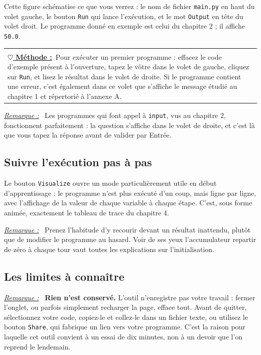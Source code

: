 \documentclass[a4paper,11pt,openany]{book}
\makeatletter
\newcommand{\code}[1]{\texttt{\textcolor{codebleu}{#1}}}
\newenvironment{cadre}%
 {\par\vspace{2mm}\noindent\begin{tabular}{|@{\hspace{4mm}}p{0.93\textwidth}@{\hspace{4mm}}|}
  \hline \\[-2mm]}%
 {\\[2mm] \hline \end{tabular}\par\vspace{3mm}}
\newcommand{\methode}{\textbf{\underline{$\heartsuit$ Méthode :}}~}
\newenvironment{remarque}%
 {\par\vspace{1mm}\begin{list}{}{\leftmargin=1cm \rightmargin=0.5cm}\item[]%
  \textit{\underline{Remarque :}}~}%
 {\end{list}\vspace{1mm}}
\makeatother
\begin{document}
Cette figure schématise ce que vous verrez : le nom de fichier \code{main.py} en haut du volet gauche, le bouton \code{Run} qui lance l'exécution, et le mot \code{Output} en tête du volet droit. Le programme donné en exemple est celui du chapitre 2 ; il affiche \code{50.0}.

\begin{cadre}
\methode Pour exécuter un premier programme : effacez le code d'exemple présent à l'ouverture, tapez le vôtre dans le volet de gauche, cliquez sur \code{Run}, et lisez le résultat dans le volet de droite. Si le programme contient une erreur, c'est également dans ce volet que s'affiche le message étudié au chapitre 1 et répertorié à l'annexe A.
\end{cadre}

\begin{remarque}
Les programmes qui font appel à \code{input}, vus au chapitre 2, fonctionnent parfaitement : la question s'affiche dans le volet de droite, et c'est là que vous tapez la réponse avant de valider par Entrée.
\end{remarque}

\subsection{Suivre l'exécution pas à pas}

Le bouton \code{Visualize} ouvre un mode particulièrement utile en début d'apprentissage : le programme n'est plus exécuté d'un coup, mais ligne par ligne, avec l'affichage de la valeur de chaque variable à chaque étape. C'est, sous forme animée, exactement le tableau de trace du chapitre 4.

\begin{remarque}
Prenez l'habitude d'y recourir devant un résultat inattendu, plutôt que de modifier le programme au hasard. Voir de ses yeux l'accumulateur repartir de zéro à chaque tour vaut toutes les explications sur l'initialisation.
\end{remarque}

\subsection{Les limites à connaître}

\begin{remarque}
\textbf{Rien n'est conservé.} L'outil n'enregistre pas votre travail : fermer l'onglet, ou parfois simplement recharger la page, efface tout. Avant de quitter, sélectionnez votre code, copiez-le et collez-le dans un fichier texte, ou utilisez le bouton \code{Share}, qui fabrique un lien vers votre programme. C'est la raison pour laquelle cet outil convient à un essai de dix minutes, non à un devoir que l'on reprend le lendemain.
\end{remarque}
\end{document}
